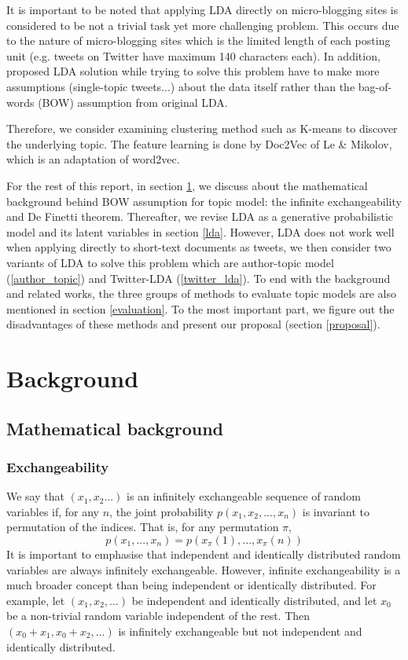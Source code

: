 \documentclass[11pt]{article}
\begin{document}
It is important to be noted that applying LDA directly on micro-blogging sites is considered to be not a trivial task yet more challenging problem. This occurs due to the nature of micro-blogging sites which is the limited length of each posting unit (e.g. tweets on Twitter have maximum 140 characters each). In addition, proposed LDA solution while trying to solve this problem have to make more assumptions (single-topic tweets...)\cite{zhao2011comparing} about the data itself rather than the bag-of-words (BOW) assumption from original LDA.

Therefore, we consider examining clustering method such as K-means to discover the underlying topic. The feature learning is done by Doc2Vec of Le \& Mikolov\cite{le2014distributed}, which is an adaptation of word2vec\cite{mikolov2013distributed}.

For the rest of this report, in section \ref{background}, we discuss about the mathematical background behind BOW assumption for topic model: the infinite exchangeability and De Finetti theorem. Thereafter, we revise LDA as a generative probabilistic model and its latent variables in section \ref{lda}. However, LDA does not work well when applying directly to short-text documents as tweets, we then consider two variants of LDA to solve this problem which are author-topic model (\ref{author_topic}) and Twitter-LDA (\ref{twitter_lda}). To end with the background and related works, the three groups of methods to evaluate topic models are also mentioned in section \ref{evaluation}. To the most important part, we figure out the disadvantages of these methods and present our proposal (section \ref{proposal}).


\section{Background} \label{background}


\subsection{Mathematical background} \label{math}

\subsubsection{Exchangeability}

We say that $(x_1,x_2...)$ is an infinitely exchangeable sequence of random variables if, for any $n$, the joint probability $p(x_1,x_2,...,x_n)$ is invariant to permutation of the indices. That is, for any permutation $\pi$,
\[p(x_1,...,x_n) = p(x_\pi(1),...,x_\pi(n))\]
It is important to emphasise that independent and identically distributed random variables are always infinitely exchangeable. However, infinite exchangeability is a much broader concept than being independent or identically distributed. 
For example, let $(x_1,x_2,\dots)$ be independent and identically distributed, and let $x_0$ be a non-trivial random variable independent of the rest. Then $(x_0+x_1,x_0+x_2,\dots)$ is infinitely exchangeable but not independent and identically distributed.
\end{document}
